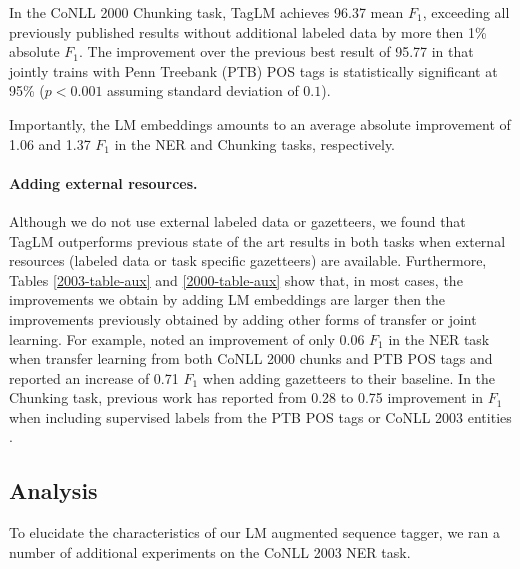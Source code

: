 \documentclass[11pt,a4paper]{article}
\begin{document}
In the CoNLL 2000 Chunking task, TagLM achieves 96.37 mean $F_1$, exceeding all previously published
results without additional labeled data by more then 1\% absolute $F_1$. 
The improvement over the previous best result of 95.77 in \citet{joint-many-iclr07} that jointly trains with Penn Treebank (PTB) POS tags is statistically significant at
95\% ($p < 0.001$ assuming standard deviation of $0.1$).

Importantly, the LM embeddings amounts to an average absolute improvement of 1.06 and 1.37 $F_1$ in the NER and Chunking tasks, respectively.

\paragraph{Adding external resources.}
Although we do not use external labeled data or gazetteers, we found that TagLM outperforms previous state of the art results in both tasks when external resources (labeled data or task specific gazetteers) are available.
Furthermore, Tables \ref{2003-table-aux} and \ref{2000-table-aux} show that, in most cases,
the improvements we obtain by adding LM embeddings are larger then the improvements previously
obtained by adding other forms of transfer or joint learning.
For example, \citet{yang-transfer-iclr07} noted an improvement of only 0.06 $F_1$ in the NER task when
transfer learning from both CoNLL 2000 chunks and PTB POS tags and \citet{chiu-nichols-2016} reported
an increase of 0.71 $F_1$ when adding gazetteers to their baseline.
In the Chunking task, previous work has reported from 0.28 to 0.75 improvement in $F_1$ when including supervised labels from
the PTB POS tags or CoNLL 2003
entities \citep{yang-transfer-iclr07,Sgaard2016DeepML,joint-many-iclr07}.

\subsection{Analysis}
To elucidate the characteristics of our LM augmented sequence tagger, we ran a number of
additional experiments  on the CoNLL 2003 NER task.
\end{document}
